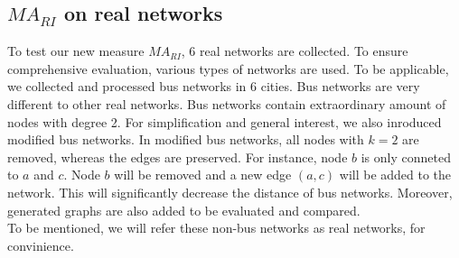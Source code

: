 \documentclass[12pt]{article}
\begin{document}
\subsection{$MA_{RI}$ on real networks}
To test our new measure $MA_{RI}$, 6 real networks are collected. To ensure comprehensive evaluation, various types of networks are used. To be applicable, we collected and processed bus networks in 6 cities. Bus networks are very different to other real networks. Bus networks contain extraordinary amount of nodes with degree 2. For simplification and general interest, we also inroduced modified bus networks. In modified bus networks, all nodes with $k=2$ are removed, whereas the edges are preserved. For instance, node $b$ is only conneted to $a$ and $c$. Node $b$ will be removed and a new edge $(a,c)$ will be added to the network. This will significantly decrease the distance of bus networks. Moreover, generated graphs are also added to be evaluated and compared.\\
To be mentioned, we will refer these non-bus networks as real networks, for convinience.
\end{document}
